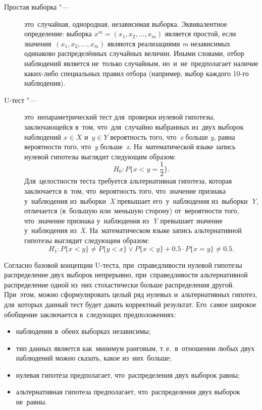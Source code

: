 \documentclass[]{scrreprt}
\begin{document}
\begin{description}
	\item[Простая выборка "---] это~случайная, однородная, независимая выборка. Эквивалентное определение: выборка ${\textstyle x^{m} = (x_{1},x_{2},\ldots,x_{m})}$ является простой, если значения~${\textstyle (x_{1},x_{2},\ldots,x_{m})}$ являются реализациями \textit{m} независимых одинаково распределённых случайных величин. Иными словами, отбор наблюдений является не~только случайным, но~и~не~предполагает наличие каких-либо специальных правил отбора (например, выбор каждого 10-го наблюдения).
\end{description}
\begin{description}
	\item[U-тест "---] это~непараметрический тест для~проверки нулевой гипотезы, заключающейся в~том, что~для~случайно выбранных из~двух выборок наблюдений ${\textstyle x \in X}$ и~${\textstyle y \in Y}$ вероятность того, что~\textit{x} больше \textit{y}, равна вероятности того, что~\textit{y} больше~\textit{x}. На~математической языке запись нулевой гипотезы выглядит следующим образом:
	\begin{equation}\label{eq:U-test-null-hypothesis}
	H_{0}:P\{x<y=\frac{1}{2}\}.
	\end{equation}
	Для~целостности теста требуется альтернативная гипотеза, которая заключается в~том, что~вероятность того, что~значение признака у~наблюдения из~выборки~\textit{X} превышает его~у~наблюдения из~выборки~\textit{Y}, отличается (в~большую или~меньшую сторону) от~вероятности того, что~значение признака у~наблюдения из~\textit{Y} превышает значение у~наблюдения из~\textit{X}. На~математическом языке запись альтернативной гипотезы выглядит следующим образом:
	\begin{equation}\label{eq:U-test-alt-hypothesis}
	H_{1}:P\{x<y\} \neq P\{y<x\} \vee P\{x<y\} + 0.5 \cdot P\{x=y\} \neq 0.5.
	\end{equation}
\end{description}
Согласно базовой концепции U-теста, при~справедливости нулевой гипотезы распределение двух выборок непрерывно, при~справедливости альтернативной распределение одной из~них стохастически больше распределения другой. При~этом, можно сформулировать целый ряд нулевых и~альтернативных гипотез, для~которых данный тест будет давать корректный результат. Его~самое широкое обобщение заключается в~следующих предположениях:
\begin{itemize}
	\item наблюдения в~обеих выборках независимы;
	\item тип данных является как~минимум ранговым, т.\,е.~в~отношении любых двух наблюдений можно сказать, какое из~них~больше;
	\item нулевая гипотеза предполагает, что~распределения двух выборок равны;
	\item альтернативная гипотеза предполагает, что~распределения двух выборок не~равны.
\end{itemize}
\end{document}
